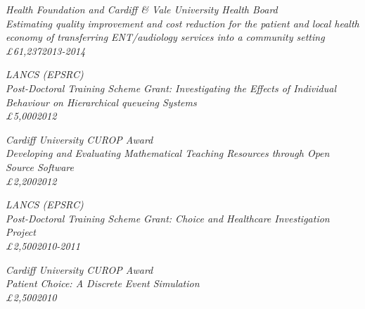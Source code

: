 \documentclass[10pt]{res} %
\begin{document}
\begin{resume}
\sl{Health Foundation and Cardiff \& Vale University Health Board}\\
Estimating quality improvement and cost reduction for the patient and local health economy of transferring ENT/audiology services into a community setting\\
\pounds61,237\hfill{2013-2014}


\sl{LANCS (EPSRC)}\\
Post-Doctoral Training Scheme Grant: Investigating the Effects of Individual Behaviour on Hierarchical queueing Systems\\
\pounds5,000\hfill{2012}


\sl{Cardiff University CUROP Award}\\
Developing and Evaluating Mathematical Teaching Resources through Open Source Software\\
\pounds2,200\hfill{2012}

\sl{LANCS (EPSRC)}\\
Post-Doctoral Training Scheme Grant: Choice and Healthcare Investigation Project\\
\pounds2,500\hfill{2010-2011}

\sl{Cardiff University CUROP Award}\\
Patient Choice: A Discrete Event Simulation\\
\pounds2,500\hfill{2010}


\end{resume}
\end{document}
